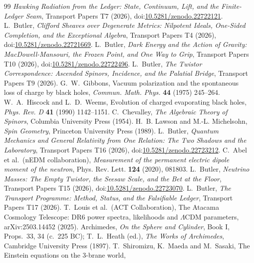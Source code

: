 \documentclass[11pt]{article}
\theoremstyle{definition}
\theoremstyle{plain}
\begin{document}
\begin{thebibliography}{99}
\emph{Hawking Radiation from the Ledger: State, Continuum, Lift, and the Finite-Ledger Seam},
Transport Papers T7 (2026), doi:\href{https://doi.org/10.5281/zenodo.22722121}{10.5281/zenodo.22722121}.
 L.~Butler,
\emph{Clifford Sheaves over Degenerate Metrics: Nilpotent Ideals, One-Sided Completion, and the Exceptional Algebra},
Transport Papers T4 (2026), doi:\href{https://doi.org/10.5281/zenodo.22721669}{10.5281/zenodo.22721669}.
 L.~Butler,
\emph{Dark Energy and the Action of Gravity: MacDowell-Mansouri, the Frozen Point, and One Way to Grip},
Transport Papers T10 (2026), doi:\href{https://doi.org/10.5281/zenodo.22722496}{10.5281/zenodo.22722496}.
 L.~Butler,
\emph{The Twistor Correspondence: Ascended Spinors, Incidence, and the Palatial Bridge},
Transport Papers T9 (2026).
 G.~W.~Gibbons,
Vacuum polarization and the spontaneous loss of charge by black holes,
\emph{Commun. Math. Phys.} \textbf{44} (1975) 245--264.
 W.~A.~Hiscock and L.~D.~Weems,
Evolution of charged evaporating black holes,
\emph{Phys. Rev. D} \textbf{41} (1990) 1142--1151.
 C.~Chevalley,
\emph{The Algebraic Theory of Spinors},
Columbia University Press (1954).
 H.~B. Lawson and M.-L. Michelsohn,
\emph{Spin Geometry},
Princeton University Press (1989).
 L.~Butler,
\emph{Quantum Mechanics and General Relativity from One Relation: The Two Shadows and the Laboratory},
Transport Papers T16 (2026), doi:\href{https://doi.org/10.5281/zenodo.22723212}{10.5281/zenodo.22723212}.
 C.~Abel et al.\ (nEDM collaboration),
\emph{Measurement of the permanent electric dipole moment of the neutron},
Phys. Rev. Lett. \textbf{124} (2020), 081803.
 L.~Butler,
\emph{Neutrino Masses: The Empty Twistor, the Seesaw Scale, and the Bet at the Floor},
Transport Papers T15 (2026), doi:\href{https://doi.org/10.5281/zenodo.22723070}{10.5281/zenodo.22723070}.
 L.~Butler,
\emph{The Transport Programme: Method, Status, and the Falsifiable Ledger},
Transport Papers T17 (2026).
 T.~Louis et al.\ (ACT Collaboration),
The Atacama Cosmology Telescope: DR6 power spectra, likelihoods and $\Lambda$CDM parameters,
arXiv:2503.14452 (2025).
 Archimedes, \emph{On the Sphere and Cylinder}, Book I, Props.~33, 34 (c.~225 BC); T.~L.~Heath (ed.), \emph{The Works of Archimedes}, Cambridge University Press (1897).
 T.~Shiromizu, K.~Maeda and M.~Sasaki,
The Einstein equations on the 3-brane world,

\end{thebibliography}
\end{document}
